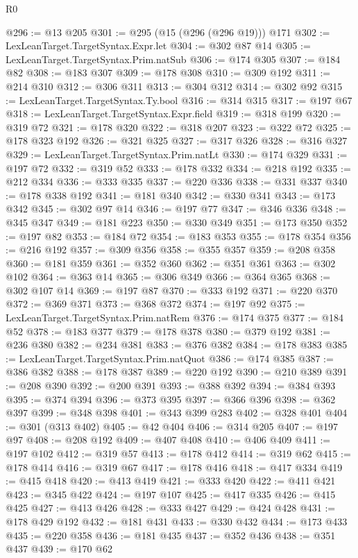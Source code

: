 \begin{lexlean}{R0}
\begin{coremodule}
@296 := @13 @205
@301 := @295 (@15 (@296 (@296 @19))) @171
@302 := LexLeanTarget.TargetSyntax.Expr.let
@304 := @302 @87 @14
@305 := LexLeanTarget.TargetSyntax.Prim.natSub
@306 := @174 @305
@307 := @184 @82
@308 := @183 @307
@309 := @178 @308
@310 := @309 @192
@311 := @214 @310
@312 := @306 @311
@313 := @304 @312
@314 := @302 @92
@315 := LexLeanTarget.TargetSyntax.Ty.bool
@316 := @314 @315
@317 := @197 @67
@318 := LexLeanTarget.TargetSyntax.Expr.field
@319 := @318 @199
@320 := @319 @72
@321 := @178 @320
@322 := @318 @207
@323 := @322 @72
@325 := @178 @323 @192
@326 := @321 @325
@327 := @317 @326
@328 := @316 @327
@329 := LexLeanTarget.TargetSyntax.Prim.natLt
@330 := @174 @329
@331 := @197 @72
@332 := @319 @52
@333 := @178 @332
@334 := @218 @192
@335 := @212 @334
@336 := @333 @335
@337 := @220 @336
@338 := @331 @337
@340 := @178 @338 @192
@341 := @181 @340
@342 := @330 @341
@343 := @173 @342
@345 := @302 @97 @14
@346 := @197 @77
@347 := @346 @336
@348 := @345 @347
@349 := @181 @223
@350 := @330 @349
@351 := @173 @350
@352 := @197 @82
@353 := @184 @72
@354 := @183 @353
@355 := @178 @354
@356 := @216 @192
@357 := @309 @356
@358 := @355 @357
@359 := @208 @358
@360 := @181 @359
@361 := @352 @360
@362 := @351 @361
@363 := @302 @102
@364 := @363 @14
@365 := @306 @349
@366 := @364 @365
@368 := @302 @107 @14
@369 := @197 @87
@370 := @333 @192
@371 := @220 @370
@372 := @369 @371
@373 := @368 @372
@374 := @197 @92
@375 := LexLeanTarget.TargetSyntax.Prim.natRem
@376 := @174 @375
@377 := @184 @52
@378 := @183 @377
@379 := @178 @378
@380 := @379 @192
@381 := @236 @380
@382 := @234 @381
@383 := @376 @382
@384 := @178 @383
@385 := LexLeanTarget.TargetSyntax.Prim.natQuot
@386 := @174 @385
@387 := @386 @382
@388 := @178 @387
@389 := @220 @192
@390 := @210 @389
@391 := @208 @390
@392 := @200 @391
@393 := @388 @392
@394 := @384 @393
@395 := @374 @394
@396 := @373 @395
@397 := @366 @396
@398 := @362 @397
@399 := @348 @398
@401 := @343 @399 @283
@402 := @328 @401
@404 := @301 (@313 @402)
@405 := @42 @404
@406 := @314 @205
@407 := @197 @97
@408 := @208 @192
@409 := @407 @408
@410 := @406 @409
@411 := @197 @102
@412 := @319 @57
@413 := @178 @412
@414 := @319 @62
@415 := @178 @414
@416 := @319 @67
@417 := @178 @416
@418 := @417 @334
@419 := @415 @418
@420 := @413 @419
@421 := @333 @420
@422 := @411 @421
@423 := @345 @422
@424 := @197 @107
@425 := @417 @335
@426 := @415 @425
@427 := @413 @426
@428 := @333 @427
@429 := @424 @428
@431 := @178 @429 @192
@432 := @181 @431
@433 := @330 @432
@434 := @173 @433
@435 := @220 @358
@436 := @181 @435
@437 := @352 @436
@438 := @351 @437
@439 := @170 @62

\end{coremodule}
\end{lexlean}
